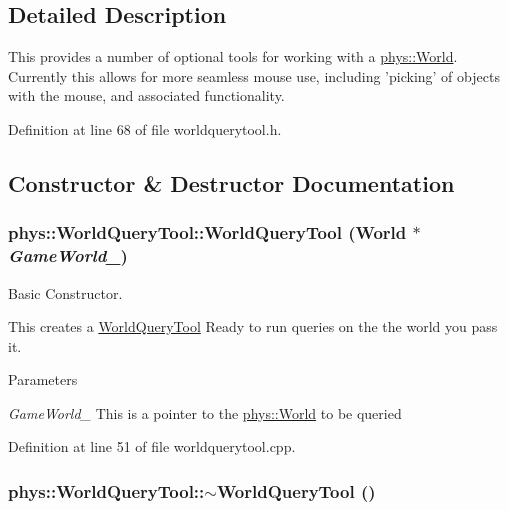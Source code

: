 \subsection{Detailed Description}
This provides a number of optional tools for working with a \hyperlink{classphys_1_1World}{phys::World}. Currently this allows for more seamless mouse use, including 'picking' of objects with the mouse, and associated functionality. 

Definition at line 68 of file worldquerytool.h.



\subsection{Constructor \& Destructor Documentation}
\hypertarget{classphys_1_1WorldQueryTool_a6b156ab7ea6236402c40467da7f11c0d}{
\subsubsection[{WorldQueryTool}]{\setlength{\rightskip}{0pt plus 5cm}phys::WorldQueryTool::WorldQueryTool ({\bf World} $\ast$ {\em GameWorld\_\-})}}
\label{d8/d69/classphys_1_1WorldQueryTool_a6b156ab7ea6236402c40467da7f11c0d}


Basic Constructor. 

This creates a \hyperlink{classphys_1_1WorldQueryTool}{WorldQueryTool} Ready to run queries on the the world you pass it. 
\begin{DoxyParams}{Parameters}
\item[{\em GameWorld\_\-}]This is a pointer to the \hyperlink{classphys_1_1World}{phys::World} to be queried \end{DoxyParams}


Definition at line 51 of file worldquerytool.cpp.

\hypertarget{classphys_1_1WorldQueryTool_ace36ffebcabbbf0553c517820bc636c9}{
\subsubsection[{$\sim$WorldQueryTool}]{\setlength{\rightskip}{0pt plus 5cm}phys::WorldQueryTool::$\sim$WorldQueryTool ()}}
\label{d8/d69/classphys_1_1WorldQueryTool_ace36ffebcabbbf0553c517820bc636c9}


